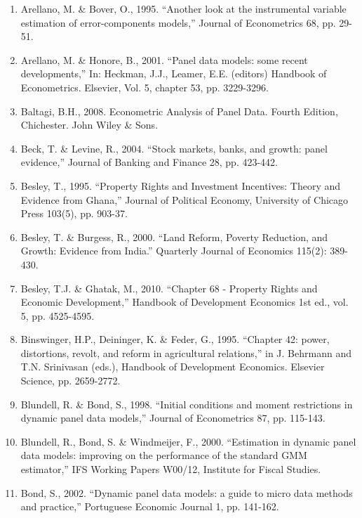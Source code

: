 \begin{enumerate}
\item Arellano, M. \& Bover, O., 1995. ``Another look at the instrumental variable estimation of error-components models,'' Journal of Econometrics 68, pp. 29-51.

\item Arellano, M. \& Honore, B., 2001. ``Panel data models: some recent developments,'' In: Heckman, J.J., Leamer, E.E. (editors) Handbook of Econometrics. Elsevier, Vol. 5, chapter 53, pp. 3229-3296.

\item Baltagi, B.H., 2008. Econometric Analysis of Panel Data. Fourth Edition, Chichester. John Wiley \& Sons.

\item Beck, T. \& Levine, R., 2004. ``Stock markets, banks, and growth: panel evidence,'' Journal of Banking
and Finance 28, pp. 423-442.

\item Besley, T., 1995. ``Property Rights and Investment Incentives: Theory and Evidence from Ghana,'' Journal of Political Economy, University of Chicago Press 103(5), pp. 903-37.

\item Besley, T. \& Burgess, R., 2000. ``Land Reform, Poverty Reduction, and Growth: Evidence from India.'' Quarterly Journal of Economics 115(2): 389-430.

\item Besley, T.J. \& Ghatak, M., 2010. ``Chapter 68 - Property Rights and Economic Development,'' Handbook of Development Economics 1st ed., vol. 5, pp. 4525-4595.

\item Binswinger, H.P., Deininger, K. \& Feder, G., 1995. ``Chapter 42: power, distortions, revolt, and reform in agricultural relations,'' in J. Behrmann and T.N. Srinivasan (eds.), Handbook of Development Economics. Elsevier Science, pp. 2659-2772.

\item Blundell, R. \& Bond, S., 1998. ``Initial conditions and moment restrictions in dynamic panel data models,'' Journal of Econometrics 87, pp. 115-143.

\item Blundell, R., Bond, S. \& Windmeijer, F., 2000.
``Estimation in dynamic panel data models: improving on the performance of the standard GMM estimator,'' IFS Working Papers W00/12, Institute for Fiscal Studies.

\item Bond, S., 2002. ``Dynamic panel data models:
a guide to micro data methods and practice,'' Portuguese Economic Journal 1, pp. 141-162.


\end{enumerate}
